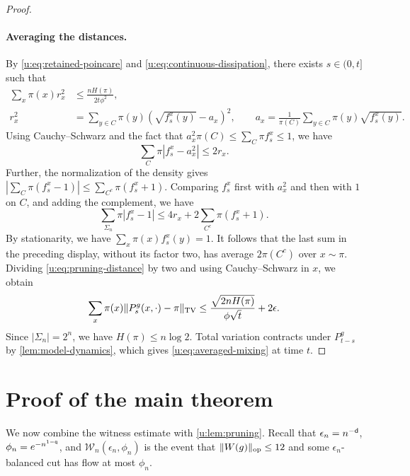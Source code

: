 \begin{proof}
\paragraph{Averaging the distances.}
By \eqref{u:eq:retained-poincare} and
\eqref{u:eq:continuous-dissipation}, there
exists $s\in(0,t]$ such that
\begin{equation}\label{u:eq:continuous-variance}
 \begin{split}
  \sum_x\pi(x)r_x^2&\le\frac{nH(\pi)}{2t\phi^2},\\
  r_x^2&=\sum_{y\in C}\pi(y)(\sqrt{f_s^x(y)}-a_x)^2,
  \qquad
  a_x=\frac1{\pi(C)}\sum_{y\in C}\pi(y)\sqrt{f_s^x(y)}.
 \end{split}
\end{equation}
Using Cauchy--Schwarz and the fact that $a_x^2\pi(C)\le\sum_C\pi f_s^x\le1$, we have
\[
 \sum_C\pi|f_s^x-a_x^2|\le2r_x.
\]
Further, the normalization of the density gives
$|\sum_C\pi(f_s^x-1)|\le\sum_{C^c}\pi(f_s^x+1)$.
Comparing $f_s^x$ first with $a_x^2$ and then with $1$ on $C$,
and adding the complement, we have
\begin{equation}\label{u:eq:pruning-distance}
 \sum_{\Sigma_n}\pi|f_s^x-1|
 \le4r_x+2\sum_{C^c}\pi(f_s^x+1).
\end{equation}
By stationarity, we have $\sum_x\pi(x)f_s^x(y)=1$. It follows that the
last sum in the preceding display, without its factor two, has
average $2\pi(C^c)$ over $x\sim\pi$. Dividing
\eqref{u:eq:pruning-distance} by two and using Cauchy--Schwarz in $x$,
we obtain
\[
 \sum_x\pi(x)\lVert P_s^g(x,\cdot)-\pi\rVert_{\mathrm{TV}}
 \le\frac{\sqrt{2nH(\pi)}}{\phi\sqrt t}+2\epsilon.
\]
Since $|\Sigma_n|=2^n$, we have $H(\pi)\le n\log2$. Total variation
contracts under $P_{t-s}^g$ by \cref{lem:model-dynamics}, which gives
\eqref{u:eq:averaged-mixing} at time $t$.
\end{proof}

\section{Proof of the main theorem}\label{u:sec:proof-upper}

We now combine the witness estimate with \cref{u:lem:pruning}. Recall
that $\epsilon_n=n^{-\mathsf{d}}$, $\phi_n=e^{-n^{1-\mathsf{q}}}$, and
$\mathcal W_n(\epsilon_n,\phi_n)$ is the event that $\lVert W(g)\rVert_{\mathrm{op}}
\le12$ and some $\epsilon_n$-balanced cut has flow at most $\phi_n$.

